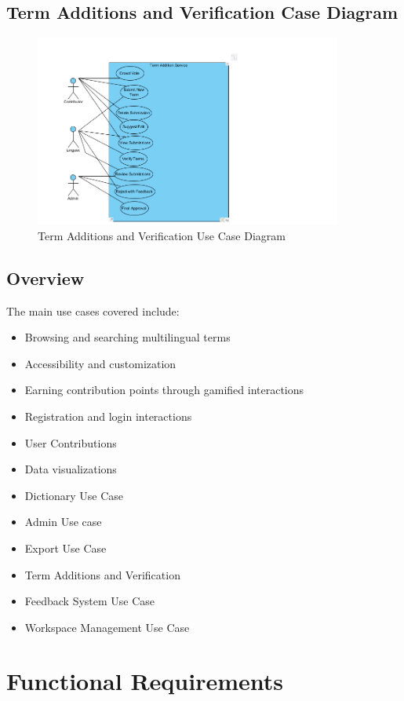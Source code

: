 \documentclass[12pt]{article}
\begin{document}
\subsection{Term Additions and Verification Case Diagram}
\begin{figure}[H]
  \centering
  \includegraphics[width=0.9\textwidth]{TermAdditions.png}
  \caption{Term Additions and Verification Use Case Diagram}
  \label{fig:Term Additions and Verification}
\end{figure}

\subsection{Overview}
The main use cases covered include:
\begin{itemize}
  \item Browsing and searching multilingual terms
  \item Accessibility and customization
  \item Earning contribution points through gamified interactions
  \item Registration and login interactions
  \item User Contributions
  \item Data visualizations
  \item Dictionary Use Case
  \item Admin Use case
  \item Export Use Case
  \item Term Additions and Verification
  \item Feedback System Use Case
  \item Workspace Management Use Case
\end{itemize}

\section{Functional Requirements}
\end{document}
